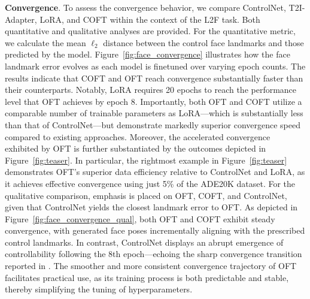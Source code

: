 \textbf{Convergence}. To assess the convergence behavior, we compare ControlNet, T2I-Adapter, LoRA, and COFT within the context of the L2F task. Both quantitative and qualitative analyses are provided. For the quantitative metric, we calculate the mean $\ell_2$ distance between the control face landmarks and those predicted by the model. Figure~\ref{fig:face_convergence} illustrates how the face landmark error evolves as each model is finetuned over varying epoch counts. The results indicate that COFT and OFT reach convergence substantially faster than their counterparts. Notably, LoRA requires 20 epochs to reach the performance level that OFT achieves by epoch 8. Importantly, both OFT and COFT utilize a comparable number of trainable parameters as LoRA—which is substantially less than that of ControlNet—but demonstrate markedly superior convergence speed compared to existing approaches. Moreover, the accelerated convergence exhibited by OFT is further substantiated by the outcomes depicted in Figure~\ref{fig:teaser}. In particular, the rightmost example in Figure~\ref{fig:teaser} demonstrates OFT's superior data efficiency relative to ControlNet and LoRA, as it achieves effective convergence using just 5\% of the ADE20K dataset. For the qualitative comparison, emphasis is placed on OFT, COFT, and ControlNet, given that ControlNet yields the closest landmark error to OFT. As depicted in Figure~\ref{fig:face_convergence_qual}, both OFT and COFT exhibit steady convergence, with generated face poses incrementally aligning with the prescribed control landmarks. In contrast, ControlNet displays an abrupt emergence of controllability following the 8th epoch—echoing the sharp convergence transition reported in \cite{zhang2023adding}. The smoother and more consistent convergence trajectory of OFT facilitates practical use, as its training process is both predictable and stable, thereby simplifying the tuning of hyperparameters.

